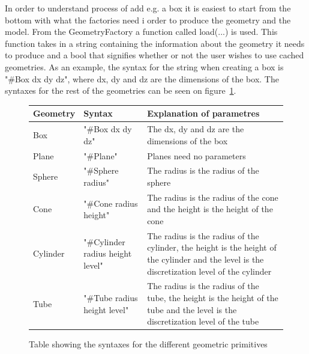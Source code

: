 In order to understand process of add e.g. a box it is easiest to start from the bottom with what the factories need i order to produce the geometry and the model. From the GeometryFactory a function called load(...) is used. This function takes in a string containing the information about the geometry it needs to produce and a bool that signifies whether or not the user wishes to use cached geometries. As an example, the syntax for the string when creating a box is "\#Box dx dy dz", where dx, dy and dz are the dimensions of the box. The syntaxes for the rest of the geometries can be seen on figure~\ref{fig:SyntaxTable}.\\

\begin{figure}[]
\centering
\begin{tabular}{|l|l|l|}
\hline
Geometry & Syntax                           & Explanation of parametres                                                                                                                    \\ \hline
Box      & "\#Box dx dy dz"                 & The dx, dy and dz are the dimensions of the box                                                                                              \\ \hline
Plane    & "\#Plane"                        & Planes need no parameters                                                                                                                    \\ \hline
Sphere   & "\#Sphere radius"                & The radius is the radius of the sphere                                                                                                       \\ \hline
Cone     & "\#Cone radius height"           & The radius is the radius of the cone and the height is the height of the cone                                                                \\ \hline
Cylinder & "\#Cylinder radius height level" & The radius is the radius of the cylinder, the height is the height of the cylinder and the level is the discretization level of the cylinder \\ \hline
Tube     & "\#Tube radius height level"     & The radius is the radius of the tube, the height is the height of the tube and the level is the discretization level of the tube             \\ \hline
\end{tabular}
\caption{Table showing the syntaxes for the different geometric primitives}
\label{fig:SyntaxTable}
\end{figure}

